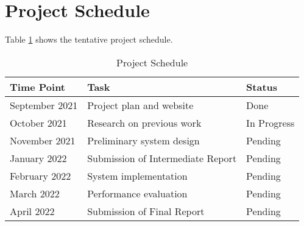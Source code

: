 \section{Project Schedule}
\label{section:schedule}

Table \ref{tab:schedule} shows the tentative project schedule.

\begin{table}[h]
    \centering
    \begin{tabular}{ | m{3cm} | m{7cm}| m{1.5cm} | } 
     \hline
     Time Point & Task & Status \\
     \hline
     \hline
     September 2021 & 
     Project plan and website &
     Done
     \\[0.5cm]
     \hline
     October 2021 & 
     Research on previous work &
     In Progress
     \\[0.5cm]
     \hline
     November 2021 & 
     Preliminary system design &
     Pending
     \\[0.5cm]
     \hline
     January 2022 & 
     Submission of Intermediate Report &
     Pending
     \\[0.5cm]
     \hline
     February 2022 & 
     System implementation &
     Pending
     \\[0.5cm]
     \hline
     March 2022 & 
     Performance evaluation &
     Pending
     \\[0.5cm]
     \hline
     April 2022 & 
     Submission of Final Report &
     Pending
     \\[0.5cm]
     \hline
    \end{tabular}
    \caption{Project Schedule}
    \label{tab:schedule}
\end{table}
